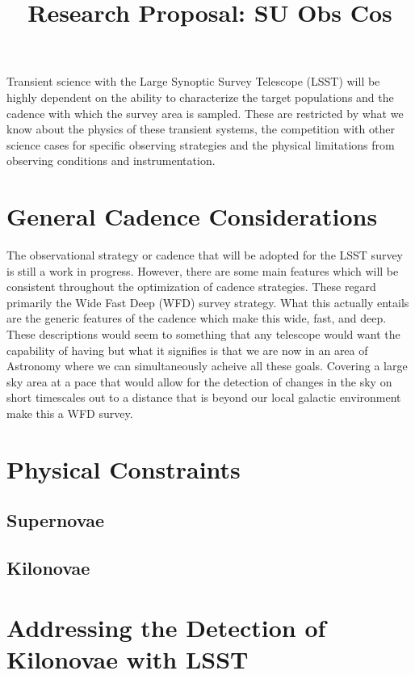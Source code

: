 \documentclass[11pt]{article}
\title{Research Proposal: SU Obs Cos}
\begin{document}
\par
\vspace{7pt}
Transient science with the Large Synoptic Survey Telescope (LSST) will be highly dependent on the ability to characterize the target populations and the cadence with which the survey area is sampled. These are restricted by what we know about the physics of these transient systems, the competition with other science cases for specific observing strategies and the physical limitations from observing conditions and instrumentation. 
\section{General Cadence Considerations} %
The observational strategy or cadence that will be adopted for the LSST survey is still a work in progress. However, there are some main features which will be consistent throughout the optimization of cadence strategies. These regard primarily the Wide Fast Deep (WFD) survey strategy. What this actually entails are the generic features of the cadence which make this wide, fast, and deep. These descriptions would seem to something that any telescope would want the capability of having but what it signifies is that we are now in an area of Astronomy where we can simultaneously acheive all these goals. Covering a large sky area at a pace that would allow for the detection of changes in the sky on short timescales out to a distance that is beyond our local galactic environment make this a WFD survey. \par



\section{Physical Constraints} %


\subsection{Supernovae}

\subsection{Kilonovae}

\section{Addressing the Detection of Kilonovae with LSST} %
\end{document}
